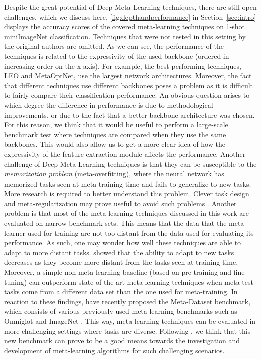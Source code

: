 Despite the great potential of Deep Meta-Learning techniques, there are still open challenges, which we discuss here.  
\autoref{fig:depthandperformance}  in Section~\ref{sec:intro} displays the accuracy scores of the covered meta-learning techniques on 1-shot miniImageNet classification. 
Techniques that were not tested in this setting by the original authors are omitted.
As we can see, the performance of the techniques is related to the expressivity of the used backbone (ordered in increasing order on the x-axis).
For example, the best-performing techniques, LEO and MetaOptNet, use the largest network architectures.
Moreover, the fact that different techniques use different backbones poses a problem as it is difficult to fairly compare their classification performance.
An obvious question arises to which degree the difference in performance is due to methodological improvements, or due to the fact that a better backbone architecture was chosen.
For this reason, we think that it would be useful to perform a large-scale benchmark test where techniques are compared when they use the same backbones. 
This would also allow us to get a more clear idea of how the expressivity of the feature extraction module affects the performance. 
Another challenge of Deep Meta-Learning techniques is that they can be susceptible to the \textit{memorization problem} (meta-overfitting), where the neural network has memorized tasks seen at meta-training time and fails to generalize to new tasks. More research is required to better understand this problem.  Clever task design and meta-regularization may prove useful to avoid such problems . 
Another problem is that most of the meta-learning techniques discussed in this work are evaluated on narrow benchmark sets. This means that the data that the meta-learner used for training are not too distant from the data used for evaluating its performance. As such, one may wonder how well these techniques are able to adapt to  more distant tasks.  showed that the ability to adapt to new tasks decreases as they become more distant from the tasks seen at training time. Moreover, a simple non-meta-learning baseline (based on pre-training and fine-tuning) can outperform state-of-the-art meta-learning techniques when meta-test tasks come from a different data set than the one used for meta-training.
In reaction to these findings,  have recently proposed the Meta-Dataset benchmark, which consists of various previously used meta-learning benchmarks such as Omniglot  and ImageNet . This way, meta-learning techniques can be evaluated in more challenging settings where tasks are diverse. Following , we think that this new benchmark can prove to be a good means towards the investigation and development of meta-learning algorithms for such challenging scenarios. 
